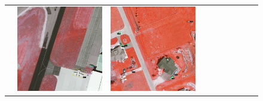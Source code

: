 \begin{figure}[H]
\begin{tabularx}{\textwidth}{c|*{9}{X}}
    &  \includegraphics[trim={650pt 120pt 170pt 720pt},clip,width=\linewidth]{images/015Results/02perm_exp/comp_images/rgir/487.png}
    & \includegraphics[trim={230pt 200pt 680pt 725pt},clip,width=\linewidth]{images/015Results/02perm_exp/comp_images/rgir/509.png}

\end{tabularx}
\end{figure}
